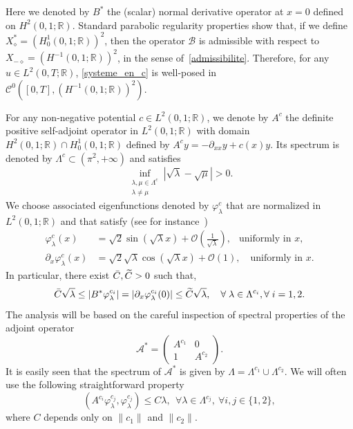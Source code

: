 \documentclass[10pt]{amsart}
\theoremstyle{definition}\newtheorem{defi}[theo]{Definition}\newtheorem{rema}[theo]{Remark}\newtheorem{exam}[theo]{Example}\newtheorem{exem}[theo]{Example}\newtheorem{nota}[theo]{Notation}
\newcommand{\fprop}[2]{\varphi^{#1}_{#2}}
\newcommand\As{\mathcal{A}^*}
\newcommand\B{\mathcal{B}}
\newcommand{\Xalphas}{X_\diamond^*}
\newcommand{\Xmalpha}{X_{-\diamond}}
\newcommand{\CC}{\mathcal{C}}
\newcommand{\R}{\mathbb{R}}
\let\oldtilde\tilde
\renewcommand*{\tilde}[1]{\mathchoice{\widetilde{#1}}{\widetilde{#1}}{\oldtilde{#1}}{\oldtilde{#1}}}\let\oldexists\exists
\renewcommand*{\exists}{\mathrel{\oldexists}}
\let\oldforall\forall
\renewcommand*{\forall}{\mathrel{\oldforall}}
\begin{document}
Here we denoted by $B^*$ the (scalar) normal derivative operator at $x=0$ defined on $H^2(0,1 ; \R)$. Standard parabolic regularity properties show that, if we define $\Xalphas=(H^1_0(0,1 ; \R))^2$, then the operator $\B$ is admissible with respect to\linebreak$\Xmalpha=(H^{-1}(0,1;\R))^2$, in the sense of~\eqref{admissibilite}. Therefore, for any $u\in L^2(0,T;\R)$, \eqref{systeme_en_c} is well-posed in $\CC^0([0,T],(H^{-1}(0,1 ; \R))^2)$.


For any non-negative potential $c\in L^2(0,1 ; \R)$, we denote by $A^c$ the definite positive self-adjoint operator in $L^2(0,1 ; \R)$ with domain $H^2(0,1 ; \R)\cap H^1_0(0,1 ; \R)$ defined by $A^c y=-\partial_{xx} y + c(x) y$. Its spectrum is denoted by $\Lambda^c\subset (\pi^2,+\infty)$ and satisfies
\begin{equation}\label{Asymptotique_Lambda_new}
\inf_{\substack{\lambda,\mu \in \Lambda^c\\ \lambda\neq\mu}} \left|\sqrt{\lambda}-\sqrt{\mu}\right| > 0.
\end{equation}
We choose associated eigenfunctions denoted by $\fprop{c}{\lambda}$ that are normalized in $L^2(0,1 ; \R)$ and that satisfy (see for instance~\cite[Theorem~4.11]{KirschBook})
\begin{align}
\fprop{c}{\lambda}(x) &= \sqrt{2}\sin(\sqrt{\lambda}x) + \mathcal{O}\left(\frac{1}{\sqrt{\lambda}} \right), \;\;\: \text{uniformly in }x,\label{Asymptotique_varphi_new}
\\
\partial_x \fprop{c}{\lambda}(x) &= \sqrt{2}\sqrt{\lambda} \cos(\sqrt{\lambda}x) + \mathcal{O}\left(1 \right), \quad \text{uniformly in }x.\label{Asymptotique_varphi'_new}
\end{align}
In particular, there exist $\bar{C},\tilde{C}>0$ such that,
\begin{equation}\label{observation_Ac}
\bar{C}\sqrt{\lambda} \leq \left|B^* \fprop{c_i}{\lambda}\right| = \left|\partial_x \fprop{c_i}{\lambda}(0)\right|\leq \tilde{C} \sqrt{\lambda}, \quad \forall \lambda\in \Lambda^{c_i}, \forall i=1,2.
\end{equation}
The analysis will be based on the careful inspection of spectral properties of the adjoint operator
\[
\As=
\begin{pmatrix}
A^{c_1}&0
\\
1 & A^{c_2}
\end{pmatrix}.
\]
It is easily seen that the spectrum of $\As$ is given by $\Lambda=\Lambda^{c_1}\cup \Lambda^{c_2}$. We will often use the following straightforward property
\begin{equation}\label{borne_H1_fprop}
(A^{c_i}\fprop{c_j}{\lambda},\fprop{c_j}{\lambda}) \leq C \lambda, \ \ \forall \lambda\in \Lambda^{c_j}, \ \forall i,j\in \{1,2\},
\end{equation}
where $C$ depends only on $\|c_1\|$ and $\|c_2\|$.
\end{document}

